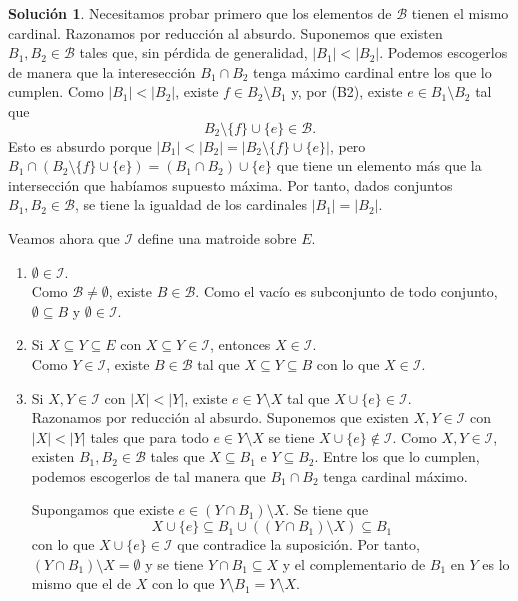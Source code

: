 \documentclass[10pt]{article}
\theoremstyle{definition}
\newtheorem*{sol}{Solución}
\begin{document}
\begin{sol}\phantom{}

Necesitamos probar primero que los elementos de $\mathcal{B}$ tienen el mismo cardinal. Razonamos por reducción al absurdo. Suponemos que existen $B_1,B_2\in\mathcal{B}$ tales que, sin pérdida de generalidad, $|B_1|< |B_2|$. Podemos escogerlos de manera que la interesección $B_1\cap B_2$ tenga máximo cardinal entre los que lo cumplen. Como $|B_1|<|B_2|$, existe $f\in B_2\setminus B_1$ y, por (B2), existe $e\in B_1\setminus B_2$ tal que 
$$B_2\setminus \{f\}\cup \{e\}\in\mathcal{B}.$$ 
Esto es absurdo porque $|B_1|<|B_2|=|B_2\setminus \{f\}\cup \{e\}|$, pero $B_1\cap(B_2\setminus\{f\}\cup\{e\}) =(B_1\cap B_2)\cup \{e\}$ que tiene un elemento más que la intersección que habíamos supuesto máxima. Por tanto, dados conjuntos $B_1,B_2\in\mathcal{B}$, se tiene la igualdad de los cardinales $|B_1|=|B_2|$.

Veamos ahora que $\mathcal{I}$ define una matroide sobre $E$.
\begin{enumerate}[labelindent=\parindent, label=(I\arabic*), ref=\arabic*]
\item $\emptyset\in\mathcal{I}$.\\
Como $\mathcal{B}\neq \emptyset$, existe $B\in\mathcal{B}$. Como el vacío es subconjunto de todo conjunto, $\emptyset\subseteq B$ y $\emptyset\in\mathcal{I}$.
\item Si $X\subseteq Y\subseteq E$ con $X\subseteq Y\in\mathcal{I}$, entonces $X\in\mathcal{I}$.\\
Como $Y\in\mathcal{I}$, existe $B\in\mathcal{B}$ tal que $X\subseteq Y\subseteq B$ con lo que $X\in\mathcal{I}$. 
\item Si $X,Y\in\mathcal{I}$ con $|X|<|Y|$, existe $e\in Y\setminus X$ tal que $X\cup\{e\}\in\mathcal{I}.$\\
Razonamos por reducción al absurdo. Suponemos que existen $X,Y\in\mathcal{I}$ con $|X|<|Y|$ tales que para todo $e\in Y\setminus X$ se tiene $X\cup\{e\}\notin\mathcal{I}$. Como $X,Y\in\mathcal{I}$, existen $B_1,B_2\in\mathcal{B}$ tales que $X\subseteq B_1$ e $Y\subseteq B_2$. Entre los que lo cumplen, podemos escogerlos de tal manera que $B_1\cap B_2$ tenga cardinal máximo.

Supongamos que existe $e\in (Y\cap B_1)\setminus X$. Se tiene que 
$$X\cup\{e\}\subseteq B_1\cup ((Y\cap B_1)\setminus X)\subseteq B_1$$
con lo que $X\cup\{e\}\in\mathcal{I}$ que contradice la suposición. Por tanto, $(Y\cap B_1)\setminus X=\emptyset$ y se tiene $Y\cap B_1\subseteq X$ y el complementario de $B_1$ en $Y$ es lo mismo que el de $X$ con lo que $Y\setminus B_1=Y\setminus X.$


\end{enumerate}
\end{sol}
\end{document}
